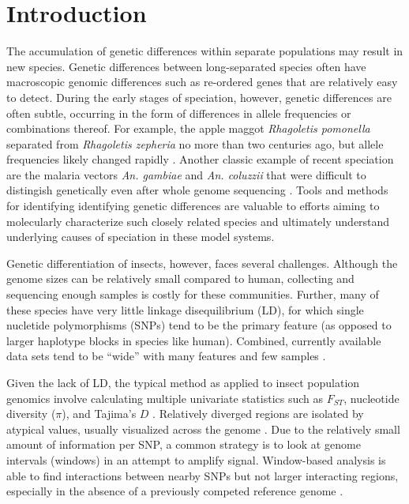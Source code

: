 \section{Introduction}
The accumulation of genetic differences within separate populations may result in new species. Genetic differences between long-separated species often have macroscopic genomic differences such as re-ordered genes that are relatively easy to detect. During the early stages of speciation, however, genetic differences are often subtle, occurring in the form of differences in allele frequencies or combinations thereof. For example, the apple maggot \emph{Rhagoletis pomonella} separated from \emph{Rhagoletis zepheria} no more than two centuries ago, but allele frequencies likely changed rapidly \cite{Egan2015}.  Another classic example of recent speciation are the malaria vectors \emph{An. gambiae} and \emph{An. coluzzii} that were difficult to distingish genetically even after whole genome sequencing \cite{Lawniczak2010}. Tools and methods for identifying identifying genetic differences are valuable to efforts aiming to molecularly characterize such closely related species and ultimately understand underlying causes of speciation in these model systems.

Genetic differentiation of insects, however, faces several challenges. Although the genome sizes can be relatively small compared to human, collecting and sequencing enough samples is costly for these communities.  Further, many of these species have very little linkage disequilibrium (LD), for which single nucletide polymorphisms (SNPs) tend to be the primary feature (as opposed to larger haplotype blocks in species like human). Combined, currently available data sets tend to be ``wide'' with many features and few samples \cite{Lawniczak2010, Egan2015, Fontaine2015}.

Given the lack of LD, the typical method as applied to insect population genomics involve calculating multiple univariate statistics such as $F_{ST}$, nucleotide diversity ($\pi$), and Tajima's $D$ \cite{Fontaine2015}. Relatively diverged regions are isolated by atypical values, usually visualized across the genome \cite{Egan2015, Fontaine2015}. Due to the relatively small amount of information per SNP, a common strategy is to look at genome intervals (windows) in an attempt to amplify signal. Window-based analysis is able to find interactions between nearby SNPs but not larger interacting regions, especially in the absence of a previously competed reference genome \cite{Egan2015}.

